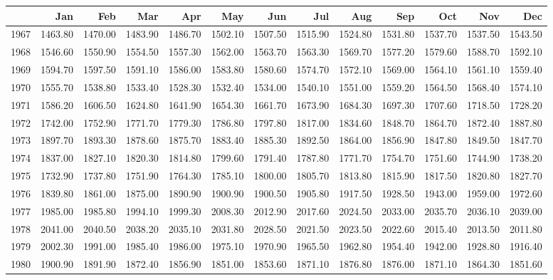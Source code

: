 \begin{longtable}{rrrrrrrrrrrrr}
  \hline
 & Jan & Feb & Mar & Apr & May & Jun & Jul & Aug & Sep & Oct & Nov & Dec \\ 
  \hline
1967 & 1463.80 & 1470.00 & 1483.90 & 1486.70 & 1502.10 & 1507.50 & 1515.90 & 1524.80 & 1531.80 & 1537.70 & 1537.50 & 1543.50 \\ 
  1968 & 1546.60 & 1550.90 & 1554.50 & 1557.30 & 1562.00 & 1563.70 & 1563.30 & 1569.70 & 1577.20 & 1579.60 & 1588.70 & 1592.10 \\ 
  1969 & 1594.70 & 1597.50 & 1591.10 & 1586.00 & 1583.80 & 1580.60 & 1574.70 & 1572.10 & 1569.00 & 1564.10 & 1561.10 & 1559.40 \\ 
  1970 & 1555.70 & 1538.80 & 1533.40 & 1528.30 & 1532.40 & 1534.00 & 1540.10 & 1551.00 & 1559.20 & 1564.50 & 1568.40 & 1574.10 \\ 
  1971 & 1586.20 & 1606.50 & 1624.80 & 1641.90 & 1654.30 & 1661.70 & 1673.90 & 1684.30 & 1697.30 & 1707.60 & 1718.50 & 1728.20 \\ 
  1972 & 1742.00 & 1752.90 & 1771.70 & 1779.30 & 1786.80 & 1797.80 & 1817.00 & 1834.60 & 1848.70 & 1864.70 & 1872.40 & 1887.80 \\ 
  1973 & 1897.70 & 1893.30 & 1878.60 & 1875.70 & 1883.40 & 1885.30 & 1892.50 & 1864.00 & 1856.90 & 1847.80 & 1849.50 & 1847.70 \\ 
  1974 & 1837.00 & 1827.10 & 1820.30 & 1814.80 & 1799.60 & 1791.40 & 1787.80 & 1771.70 & 1754.70 & 1751.60 & 1744.90 & 1738.20 \\ 
  1975 & 1732.90 & 1737.80 & 1751.90 & 1764.30 & 1785.10 & 1800.00 & 1805.70 & 1813.80 & 1815.90 & 1817.50 & 1820.80 & 1827.70 \\ 
  1976 & 1839.80 & 1861.00 & 1875.00 & 1890.90 & 1900.90 & 1900.50 & 1905.80 & 1917.50 & 1928.50 & 1943.00 & 1959.00 & 1972.60 \\ 
  1977 & 1985.00 & 1985.80 & 1994.10 & 1999.30 & 2008.30 & 2012.90 & 2017.60 & 2024.50 & 2033.00 & 2035.70 & 2036.10 & 2039.00 \\ 
  1978 & 2041.00 & 2040.50 & 2038.20 & 2035.10 & 2031.80 & 2028.50 & 2021.50 & 2023.50 & 2022.60 & 2015.40 & 2013.50 & 2011.80 \\ 
  1979 & 2002.30 & 1991.00 & 1985.40 & 1986.00 & 1975.10 & 1970.90 & 1965.50 & 1962.80 & 1954.40 & 1942.00 & 1928.80 & 1916.40 \\ 
  1980 & 1900.90 & 1891.90 & 1872.40 & 1856.90 & 1851.00 & 1853.60 & 1871.10 & 1876.80 & 1876.00 & 1871.10 & 1864.30 & 1851.60 \\ 

\end{longtable}

